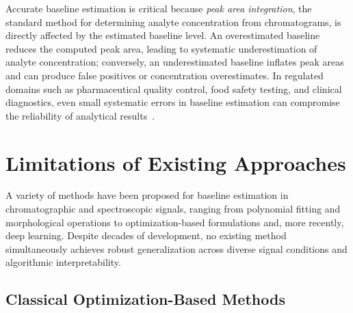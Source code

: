 Accurate baseline estimation is critical because \emph{peak area integration}, the standard method for determining analyte concentration from chromatograms, is directly affected by the estimated baseline level. An overestimated baseline reduces the computed peak area, leading to systematic underestimation of analyte concentration; conversely, an underestimated baseline inflates peak areas and can produce false positives or concentration overestimates. In regulated domains such as pharmaceutical quality control, food safety testing, and clinical diagnostics, even small systematic errors in baseline estimation can compromise the reliability of analytical results~\cite{ning2014beads, eilers2005baseline}.



\section{Limitations of Existing Approaches}
\label{sec:intro_limitations}

A variety of methods have been proposed for baseline estimation in chromatographic and spectroscopic signals, ranging from polynomial fitting and morphological operations to optimization-based formulations and, more recently, deep learning. Despite decades of development, no existing method simultaneously achieves robust generalization across diverse signal conditions and algorithmic interpretability.

\subsection{Classical Optimization-Based Methods}
\label{sec:intro_classical}

